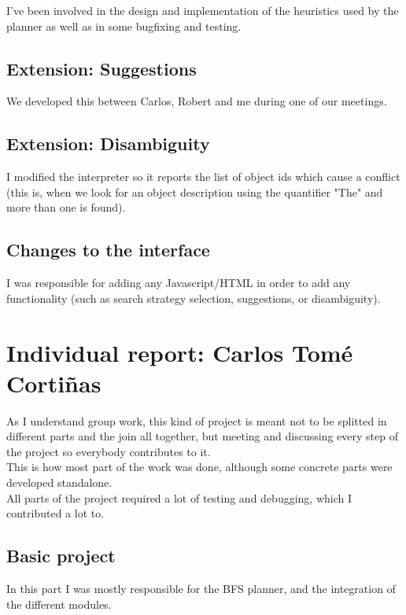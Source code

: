 \documentclass[11pt]{article}
\begin{document}
I've been involved in the design and implementation of the heuristics used by the planner as well as in some 
bugfixing and testing.

\subsection{Extension: Suggestions}

We developed this between Carlos, Robert and me during one of our meetings.

\subsection{Extension: Disambiguity}

I modified the interpreter so it reports the list of object ids which cause a conflict (this is, 
when we look for an object description using the quantifier "The" and more than one is found).

\subsection{Changes to the interface}

I was responsible for adding any Javascript/HTML in order to add any functionality (such as search strategy selection, suggestions, or disambiguity). 

\section{Individual report: Carlos Tomé Cortiñas}
As I understand group work, this kind of project is meant not to be splitted 
in different parts and the join all together, but meeting and discussing every step
of the project so everybody contributes to it.  \\

This is how most part of the work was done, although some concrete parts were 
developed standalone.  \\

All parts of the project required a lot of testing and debugging, which I 
contributed a lot to.  \\

\subsection{Basic project}
In this part I was mostly responsible for the BFS planner, and the integration 
of the different modules. \\
\end{document}
